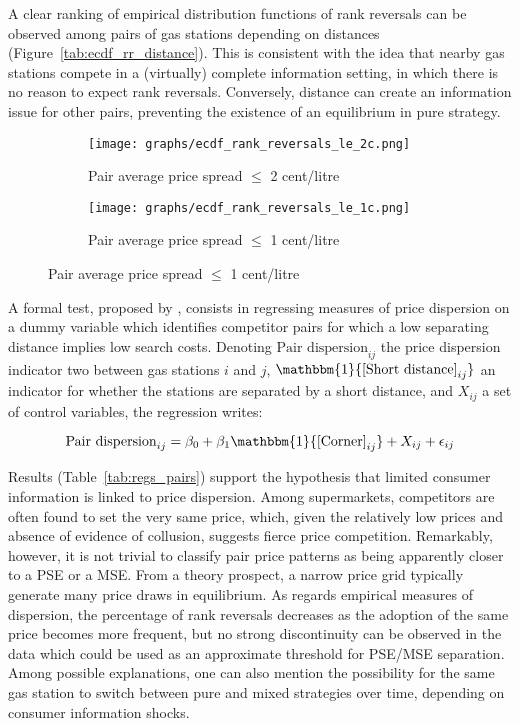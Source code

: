 \documentclass[english]{article}
\begin{document}
A clear ranking of empirical distribution functions of rank reversals can be observed among pairs of gas stations depending on distances (Figure~\ref{tab:ecdf_rr_distance}). This is consistent with the idea that nearby gas stations compete in a (virtually) complete information setting, in which there is no reason to expect rank reversals. Conversely, distance can create an information issue for other pairs, preventing the existence of an equilibrium in pure strategy.

\begin{figure}[H]
\centering
\caption{Empirical distribution functions of rank reversals (raw prices)}
\label{tab:ecdf_rr_distance}
\begin{subfigure}{.49\textwidth}
\centering
\texttt{[image: graphs/ecdf\_rank\_reversals\_le\_2c.png]}
\caption[short]{Pair average price spread $\le$ 2 cent/litre}
\end{subfigure}
\begin{subfigure}{.49\textwidth}
\centering
\texttt{[image: graphs/ecdf\_rank\_reversals\_le\_1c.png]}
\caption[short]{Pair average price spread $\le$ 1 cent/litre}
\end{subfigure}
\end{figure}

A formal test, proposed by \cite{TAP11}, consists in regressing measures of price dispersion on a dummy variable which identifies competitor pairs for which a low separating distance implies low search costs. Denoting $\text{Pair dispersion}_{ij}$ the price dispersion indicator two between gas stations $i$ and $j$, $\mathbbm{1}{\text{[Short distance]}_{ij}}$ an indicator for whether the stations are separated by a short distance, and $X_{ij}$ a set of control variables, the regression writes:

\begin{equation}
\text{Pair dispersion}_{ij}= \beta_0 + \beta_1 \mathbbm{1}{\text{[Corner]}_{ij}} + X_{ij} + \epsilon_{ij}
\end{equation}

Results (Table~\ref{tab:regs_pairs}) support the hypothesis that limited consumer information is linked to price dispersion. Among supermarkets, competitors are often found to set the very same price, which, given the relatively low prices and absence of evidence of collusion, suggests fierce price competition. Remarkably, however, it is not trivial to classify pair price patterns as being apparently closer to a PSE or a MSE. From a theory prospect, a narrow price grid typically generate many price draws in equilibrium. As regards empirical measures of dispersion, the percentage of rank reversals decreases as the adoption of the same price becomes more frequent, but no strong discontinuity can be observed in the data which could be used as an approximate threshold for PSE/MSE separation. Among possible explanations, one can also mention the possibility for the same gas station to switch between pure and mixed strategies over time, depending on consumer information shocks.
\end{document}

